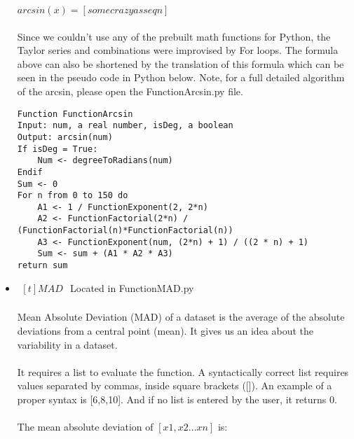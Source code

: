 \begin{itemize}
            \begin{center}
                $arcsin(x) = [some crazyass eqn]$
            \end{center}

            \paragraph{}
            Since we couldn’t use any of the prebuilt math functions for Python, the Taylor series and combinations were improvised by For loops. The formula above can also be shortened by  the translation of this formula which can be seen in the pseudo code in Python below. Note, for a full detailed algorithm of the arcsin, please open the FunctionArcsin.py file.

            \begin{lstlisting}
Function FunctionArcsin
Input: num, a real number, isDeg, a boolean
Output: arcsin(num)
If isDeg = True:
	Num <- degreeToRadians(num)
Endif
Sum <- 0
For n from 0 to 150 do
	A1 <- 1 / FunctionExponent(2, 2*n)
	A2 <- FunctionFactorial(2*n) / (FunctionFactorial(n)*FunctionFactorial(n))
	A3 <- FunctionExponent(num, (2*n) + 1) / ((2 * n) + 1)
	Sum <- sum + (A1 * A2 * A3)
return sum
            \end{lstlisting}

        \item $\begin{aligned}[t]
            MAD
        \end{aligned}$
            Located in FunctionMAD.py

            \paragraph{}
            Mean Absolute Deviation (MAD) of a dataset is the average of the absolute deviations from a central point (mean). It gives us an idea about the variability in a dataset.

            \paragraph{}
            It requires a list to evaluate the function. A syntactically correct list requires values separated by commas, inside square brackets ([]). An example of a proper syntax is [6,8,10]. And if no list is entered by the user, it returns 0.

            \paragraph{}
            The mean absolute deviation of $[x1,x2...xn]$ is:


\end{itemize}
